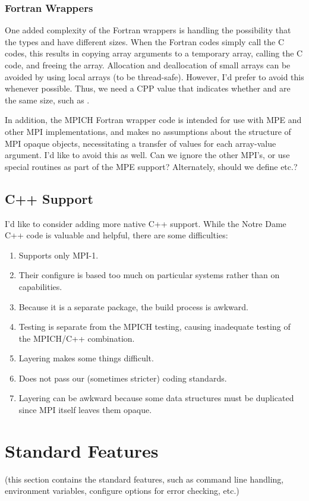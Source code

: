 \documentclass{article}
\begin{document}
\subsubsection{Fortran Wrappers}
One added complexity of the Fortran wrappers is handling the possibility that
the types  and  have different sizes.  When the
Fortran codes simply call the C codes, this results in copying array arguments
to a temporary array, calling the C code, and freeing the array.  Allocation
and deallocation of small arrays can be avoided by using local arrays (to be
thread-safe).  However, I'd prefer to avoid this whenever possible.  Thus, we
need a CPP value that indicates whether  and  are the
same size, such as .

In addition, the MPICH Fortran wrapper code is intended for use with MPE and
other MPI implementations, and makes no assumptions about the structure of
MPI opaque objects, necessitating a transfer of values for each array-value
argument.  I'd like to avoid this as well.  Can we ignore the other MPI's, or
use special routines as part of the MPE support?  Alternately, should we
define  etc.?

\subsection{C++ Support}
\label{sec:c++}
I'd like to consider adding more native C++ support.  While the Notre
Dame C++ code is valuable and helpful, there are some difficulties:
\begin{enumerate}
\item Supports only MPI-1.
\item Their configure is based too much on particular systems rather than on
capabilities. 
\item Because it is a separate package, the build process is awkward.
\item Testing is separate from the MPICH testing, causing inadequate
testing of the MPICH/C++ combination.
\item Layering makes some things difficult. 
\item Does not pass our (sometimes stricter) coding standards.
\item Layering can be awkward because some data structures must be
duplicated since MPI itself leaves them opaque. 
\end{enumerate}

\section{Standard Features}
\label{sec:standard-features}
(this section contains the standard features, such as command line
handling, environment variables, configure options for error checking,
etc.)
\end{document}
